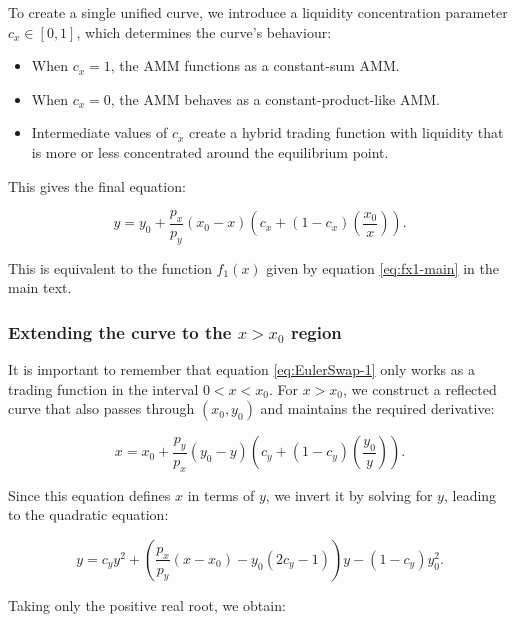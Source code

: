 \documentclass{article}
\begin{document}
To create a single unified curve, we introduce a liquidity concentration parameter \( c_x \in [0, 1] \), which determines the curve’s behaviour:

\begin{itemize}
    \item When \( c_x = 1 \), the AMM functions as a constant-sum AMM.
    \item When \( c_x = 0 \), the AMM behaves as a constant-product-like AMM.
    \item Intermediate values of \( c_x \) create a hybrid trading function with liquidity that is more or less concentrated around the equilibrium point.
\end{itemize}

This gives the final equation:

\begin{equation}
    \label{eq:EulerSwap-1}
    y = y_0 + \frac{p_x}{p_y} (x_0 - x) \left( c_x + (1 - c_x) \left(\frac{x_0}{x}\right) \right).
\end{equation}

This is equivalent to the function \( f_1(x) \) given by equation \eqref{eq:fx1-main} in the main text.

\subsubsection{Extending the curve to the $x > x_0$ region}

It is important to remember that equation \eqref{eq:EulerSwap-1} only works as a trading function in the interval $0 < x < x_0$. For \( x > x_0 \), we construct a reflected curve that also passes through \( (x_0, y_0) \) and maintains the required derivative:

\begin{equation}
    \label{eq:EulerSwap-3-inverse}
    x = x_0 + \frac{p_y}{p_x} (y_0 - y) \left( c_y + (1 - c_y) \left(\frac{y_0}{y}\right) \right).
\end{equation}

Since this equation defines \( x \) in terms of \( y \), we invert it by solving for \( y \), leading to the quadratic equation:

\begin{equation}
    y = c_y y^2 + \left( \frac{p_x}{p_y} (x - x_0) - y_0(2c_y - 1) \right)y - (1 - c_y) y_0^2.
\end{equation}

Taking only the positive real root, we obtain:
\end{document}
